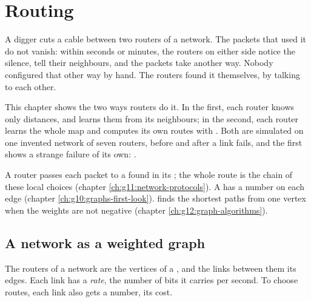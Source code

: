 \chapter{Routing}\label{ch:g12:routing}

A digger cuts a cable between two routers of a network. The packets that used it do not vanish: within seconds or
minutes, the routers on either side notice the silence, tell their neighbours, and the packets take another way.
Nobody configured that other way by hand. The routers found it themselves, by talking to each other.

This chapter shows the two ways routers do it. In the first, each router knows only distances, and learns them from
its neighbours; in the second, each router learns the whole map and computes its own routes with . Both are simulated on one invented network of seven routers, before and after a link fails, and the first
shows a strange failure of its own: .

\begin{recall}
A router passes each packet to a \emph{} found in its ; the whole route is the chain of these
local choices (chapter \ref{ch:g11:network-protocols}). A  has a number on each edge
(chapter \ref{ch:g10:graphs-first-look}).  finds the shortest paths from one vertex when the
weights are not negative (chapter \ref{ch:g12:graph-algorithms}).
\end{recall}

\section{A network as a weighted graph}\label{sec:g12:routing:graph}

The routers of a network are the vertices of a , and the links between them its edges. Each link has a
\emph{rate}, the number of bits it carries per second. To choose routes, each link also gets a number, its cost.


